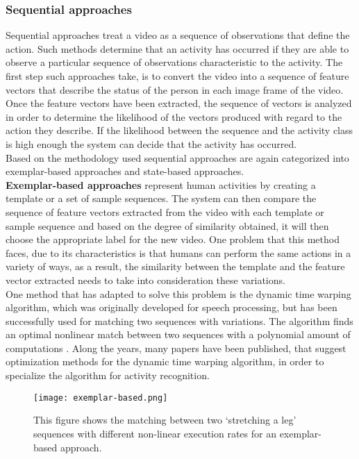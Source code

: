 \documentclass[11pt]{report}
\begin{document}
\subsubsection{Sequential approaches}
Sequential approaches treat a video as a sequence of observations that define the action. Such methods determine that an activity has occurred if they are able to observe a particular sequence of observations characteristic to the activity. The first step such approaches take, is to convert the video into a sequence of feature vectors that describe the status of the person in each image frame of the video. Once the feature vectors have been extracted, the sequence of vectors is analyzed in order to determine the likelihood of the vectors produced with regard to the action they describe. If the likelihood between the sequence and the activity class is high enough the system can decide that the activity has occurred. \\
Based on the methodology used sequential approaches are again categorized into exemplar-based approaches and state-based approaches. \\

\textbf{Exemplar-based approaches} represent human activities by creating a template or a set of sample sequences. The system can then compare the sequence of feature vectors extracted from the video with each template or sample sequence and based on the degree of similarity obtained, it will then choose the appropriate label for the new video. One problem that this method faces, due to its characteristics is that humans can perform the same actions in a variety of ways, as a result, the similarity between the template and the feature vector extracted needs to take into consideration these variations. \\
One method that has adapted to solve this problem is the dynamic time warping algorithm, which was originally developed for speech processing, but has been successfully used for matching two sequences with variations. The algorithm finds an optimal nonlinear match between two sequences with a polynomial amount of computations \cite{DTW}. Along the years, many papers have been published, that suggest optimization methods for the dynamic time warping algorithm, in order to specialize the algorithm for activity recognition.\\

\begin{figure}
    \centering
    \texttt{[image: exemplar-based.png]}
    \caption{This figure shows the matching between two `stretching a leg' sequences with different non-linear execution rates for an exemplar-based approach.}
    \label{fig:exemplar-based}
\end{figure}
\end{document}

